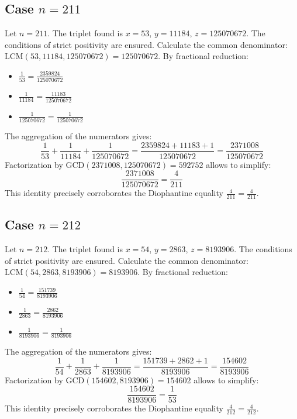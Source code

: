 \documentclass[11pt,a4paper]{article}
\begin{document}
\subsection{Case $n = 211$}
Let $n = 211$. The triplet found is $x = 53$, $y = 11184$, $z = 125070672$.
The conditions of strict positivity are ensured.
Calculate the common denominator: $\text{LCM}(53, 11184, 125070672) = 125070672$.
By fractional reduction:
\begin{itemize}
    \item $\frac{1}{53} = \frac{2359824}{125070672}$
    \item $\frac{1}{11184} = \frac{11183}{125070672}$
    \item $\frac{1}{125070672} = \frac{1}{125070672}$
\end{itemize}
The aggregation of the numerators gives:
$$ \frac{1}{53} + \frac{1}{11184} + \frac{1}{125070672} = \frac{2359824 + 11183 + 1}{125070672} = \frac{2371008}{125070672} $$
Factorization by $\text{GCD}(2371008, 125070672) = 592752$ allows to simplify:
$$ \frac{2371008}{125070672} = \frac{4}{211} $$
This identity precisely corroborates the Diophantine equality $\frac{4}{211} = \frac{4}{211}$.

\subsection{Case $n = 212$}
Let $n = 212$. The triplet found is $x = 54$, $y = 2863$, $z = 8193906$.
The conditions of strict positivity are ensured.
Calculate the common denominator: $\text{LCM}(54, 2863, 8193906) = 8193906$.
By fractional reduction:
\begin{itemize}
    \item $\frac{1}{54} = \frac{151739}{8193906}$
    \item $\frac{1}{2863} = \frac{2862}{8193906}$
    \item $\frac{1}{8193906} = \frac{1}{8193906}$
\end{itemize}
The aggregation of the numerators gives:
$$ \frac{1}{54} + \frac{1}{2863} + \frac{1}{8193906} = \frac{151739 + 2862 + 1}{8193906} = \frac{154602}{8193906} $$
Factorization by $\text{GCD}(154602, 8193906) = 154602$ allows to simplify:
$$ \frac{154602}{8193906} = \frac{1}{53} $$
This identity precisely corroborates the Diophantine equality $\frac{4}{212} = \frac{4}{212}$.
\end{document}
